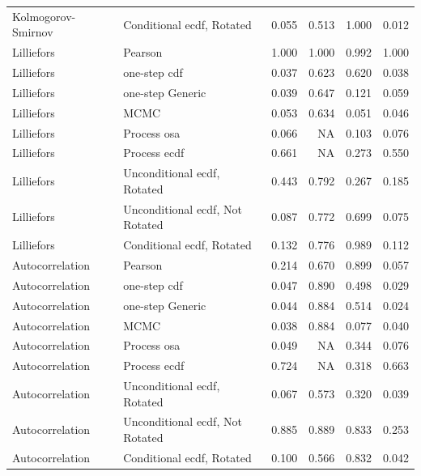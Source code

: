 \documentclass[
]{article}
\begin{document}
\begin{table}[H]
\begin{tabular}[t]{llrrrr}
Kolmogorov- Smirnov & Conditional ecdf, Rotated & 0.055 & 0.513 & 1.000 & 0.012\\
Lilliefors & Pearson & 1.000 & 1.000 & 0.992 & 1.000\\
Lilliefors & one-step cdf & 0.037 & 0.623 & 0.620 & 0.038\\
\addlinespace
Lilliefors & one-step Generic & 0.039 & 0.647 & 0.121 & 0.059\\
Lilliefors & MCMC & 0.053 & 0.634 & 0.051 & 0.046\\
Lilliefors & Process osa & 0.066 & NA & 0.103 & 0.076\\
Lilliefors & Process ecdf & 0.661 & NA & 0.273 & 0.550\\
Lilliefors & Unconditional ecdf, Rotated & 0.443 & 0.792 & 0.267 & 0.185\\
\addlinespace
Lilliefors & Unconditional ecdf, Not Rotated & 0.087 & 0.772 & 0.699 & 0.075\\
Lilliefors & Conditional ecdf, Rotated & 0.132 & 0.776 & 0.989 & 0.112\\
Autocorrelation & Pearson & 0.214 & 0.670 & 0.899 & 0.057\\
Autocorrelation & one-step cdf & 0.047 & 0.890 & 0.498 & 0.029\\
Autocorrelation & one-step Generic & 0.044 & 0.884 & 0.514 & 0.024\\
\addlinespace
Autocorrelation & MCMC & 0.038 & 0.884 & 0.077 & 0.040\\
Autocorrelation & Process osa & 0.049 & NA & 0.344 & 0.076\\
Autocorrelation & Process ecdf & 0.724 & NA & 0.318 & 0.663\\
Autocorrelation & Unconditional ecdf, Rotated & 0.067 & 0.573 & 0.320 & 0.039\\
Autocorrelation & Unconditional ecdf, Not Rotated & 0.885 & 0.889 & 0.833 & 0.253\\
\addlinespace
Autocorrelation & Conditional ecdf, Rotated & 0.100 & 0.566 & 0.832 & 0.042\\
\bottomrule
\end{tabular}
\end{table}

\clearpage
\newpage


\end{document}
